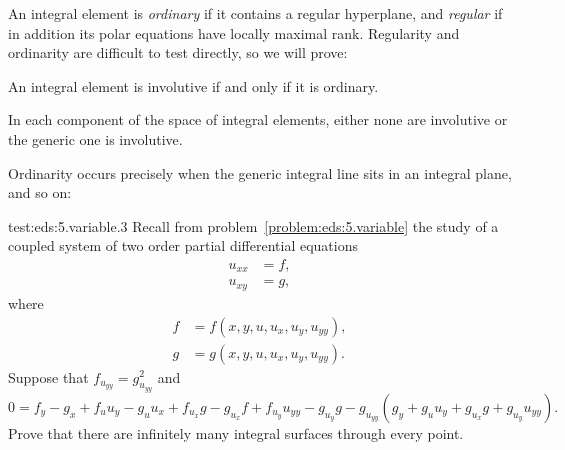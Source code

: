 An integral element is \emph{ordinary} if it contains a regular hyperplane, and \emph{regular} if in addition its polar equations have locally maximal rank.
Regularity and ordinarity are difficult to test directly, so we will prove:
\begin{theorem}\label{theorem:test}
An integral element is involutive if and only if it is ordinary.
\end{theorem}
\begin{corollary}
In each component of the space of integral elements, either none are involutive or the generic one is involutive.
\end{corollary}
Ordinarity occurs precisely when the generic integral line sits in an integral plane, and so on:
\begin{problem}{test:eds:5.variable.3}
Recall from problem~\vref{problem:eds:5.variable} the study of a coupled system of two  order partial differential equations
\begin{align*}
u_{xx}&=f,\\
u_{xy}&=g,
\end{align*}
where
\begin{align*}
f&=f(x,y,u,u_x,u_y,u_{yy}),\\
g&=g(x,y,u,u_x,u_y,u_{yy}).
\end{align*}
Suppose that \(f_{u_{yy}}=g_{u_{yy}}^2\) and
\[
0=
f_y
-g_x
+f_u u_y
-g_u u_x
+f_{u_x}g
-g_{u_x}f
+f_{u_y}u_{yy}
-g_{u_y}g
-g_{u_{yy}}(g_y+g_u u_y + g_{u_x} g + g_{u_y} u_{yy}).
\]
Prove that there are infinitely many integral surfaces through every point.
\end{problem}
